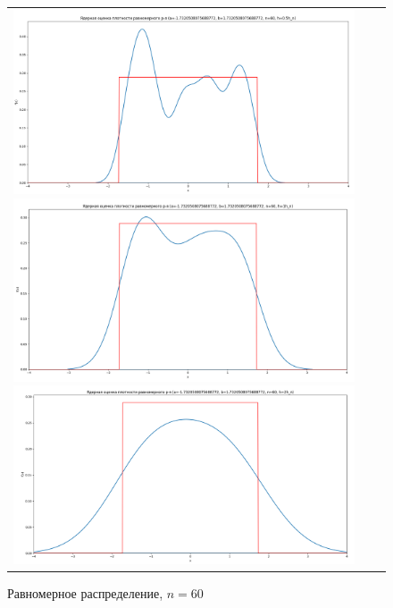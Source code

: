 \begin{figure}[H]
	\begin{tabular}{ccc}
		\includegraphics[scale=0.14]{resources/4_uniform_60_half.png}
		\includegraphics[scale=0.14]{resources/4_uniform_60_one.png}
		\includegraphics[scale=0.14]{resources/4_uniform_60_two.png}
	\end{tabular}
	\caption{Равномерное распределение, $n=60$}
\end{figure}

